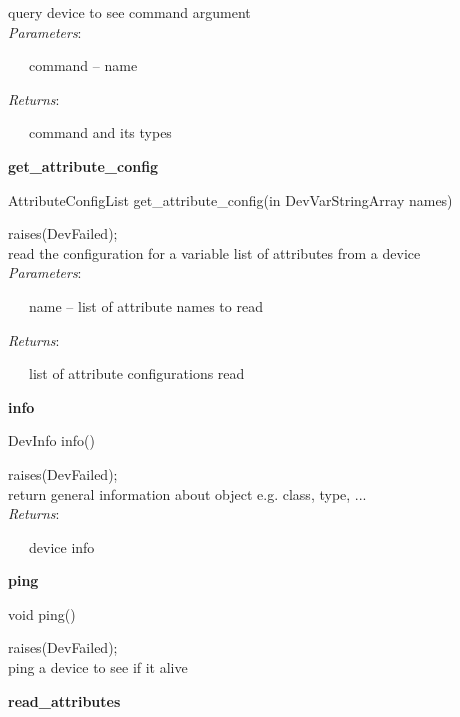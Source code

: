 query device to see command argument\\


\emph{Parameters}:

~~~command -- name

\emph{Returns}:

~~~command and its types\\


\begin{flushleft}
\textbf{get\_attribute\_config}
\par\end{flushleft}

AttributeConfigList get\_attribute\_config(in DevVarStringArray names)

raises(DevFailed);\\


read the configuration for a variable list of attributes from a device\\


\emph{Parameters}:

~~~name -- list of attribute names to read

\emph{Returns}:

~~~list of attribute configurations read\\


\begin{flushleft}
\textbf{info}
\par\end{flushleft}

DevInfo info()

raises(DevFailed);\\


return general information about object e.g. class, type, ...\\


\emph{Returns}:

~~~device info\\


\begin{flushleft}
\textbf{ping}
\par\end{flushleft}

void ping()

raises(DevFailed);\\


ping a device to see if it alive\\


\begin{flushleft}
\textbf{read\_attributes}
\par\end{flushleft}

